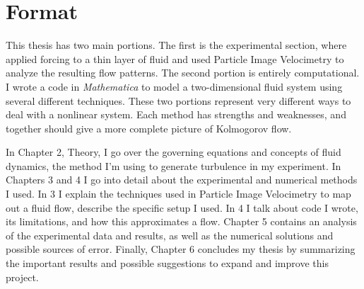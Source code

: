 \section{Format}

	This thesis has two main portions.  The first is the experimental section, where applied forcing to a thin layer of fluid and used Particle Image Velocimetry to analyze the resulting flow patterns.  The second portion is entirely computational.  I wrote a code in \textit{Mathematica} to model a two-dimensional fluid system using several different techniques.  These two portions represent very different ways to deal with a nonlinear system.  Each method has strengths and weaknesses, and together should give a more complete picture of Kolmogorov flow.

	In Chapter 2, Theory, I go over the governing equations and concepts of fluid dynamics, the method I'm using to generate turbulence in my experiment.  In Chapters 3 and 4 I go into detail about the experimental and numerical methods I used.  In 3 I explain the techniques used in Particle Image Velocimetry to map out a fluid flow, describe the specific setup I used.  In 4 I talk about code I wrote, its limitations, and how this approximates a flow.  Chapter 5 contains an analysis of the experimental data and results, as well as the numerical solutions and possible sources of error.  Finally, Chapter 6 concludes my thesis by summarizing the important results and possible suggestions to expand and improve this project.

	
